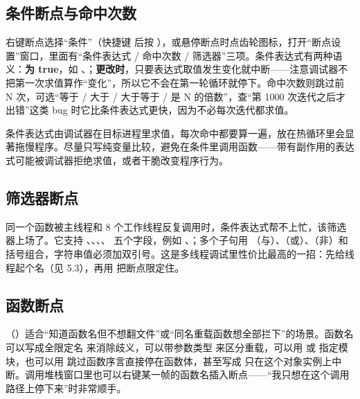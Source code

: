 \subsection{条件断点与命中次数}

右键断点选择“条件”（快捷键  后按 ），或悬停断点时点齿轮图标，打开“断点设置”窗口，里面有“条件表达式 / 命中次数 / 筛选器”三项。条件表达式有两种语义：\textbf{为 true}，如 、；\textbf{更改时}，只要表达式取值发生变化就中断——注意调试器不把第一次求值算作“变化”，所以它不会在第一轮循环就停下。命中次数则跳过前 N 次，可选“等于 / 大于 / 大于等于 / 是 N 的倍数”，查“第 1000 次迭代之后才出错”这类 bug 时它比条件表达式更快，因为不必每次迭代都求值。

\begin{warnbox}[注意]
条件表达式由调试器在目标进程里求值，每次命中都要算一遍，放在热循环里会显著拖慢程序。尽量只写纯变量比较，避免在条件里调用函数——带有副作用的表达式可能被调试器拒绝求值，或者干脆改变程序行为。
\end{warnbox}

\subsection{筛选器断点}

同一个函数被主线程和 8 个工作线程反复调用时，条件表达式帮不上忙，该筛选器上场了。它支持 、、、、 五个字段，例如 、；多个子句用 \code{&}（与）、\code{||}（或）、\code{!}（非）和括号组合，字符串值必须加双引号。这是多线程调试里性价比最高的一招：先给线程起个名（见 5.3），再用  把断点限定住。

\subsection{函数断点}

（）适合“知道函数名但不想翻文件”或“同名重载函数想全部拦下”的场景。函数名可以写成全限定名  来消除歧义，可以带参数类型  来区分重载，可以用  或  指定模块，也可以用  跳过函数序言直接停在函数体，甚至写成  只在这个对象实例上中断。调用堆栈窗口里也可以右键某一帧的函数名插入断点——“我只想在这个调用路径上停下来”时非常顺手。

